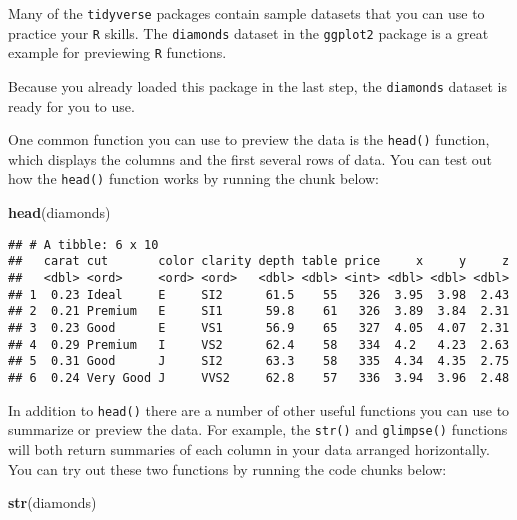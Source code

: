\documentclass[
]{article}
\newenvironment{Shaded}{\begin{snugshade}}{\end{snugshade}}
\newcommand{\FunctionTok}[1]{\textcolor[rgb]{0.13,0.29,0.53}{\textbf{#1}}}
\newcommand{\NormalTok}[1]{#1}
\begin{document}
Many of the \texttt{tidyverse} packages contain sample datasets that you
can use to practice your \texttt{R} skills. The \texttt{diamonds}
dataset in the \texttt{ggplot2} package is a great example for
previewing \texttt{R} functions.

Because you already loaded this package in the last step, the
\texttt{diamonds} dataset is ready for you to use.

One common function you can use to preview the data is the
\texttt{head()} function, which displays the columns and the first
several rows of data. You can test out how the \texttt{head()} function
works by running the chunk below:

\begin{Shaded}
\begin{Highlighting}[]
\FunctionTok{head}\NormalTok{(diamonds)}
\end{Highlighting}
\end{Shaded}

\begin{verbatim}
## # A tibble: 6 x 10
##   carat cut       color clarity depth table price     x     y     z
##   <dbl> <ord>     <ord> <ord>   <dbl> <dbl> <int> <dbl> <dbl> <dbl>
## 1  0.23 Ideal     E     SI2      61.5    55   326  3.95  3.98  2.43
## 2  0.21 Premium   E     SI1      59.8    61   326  3.89  3.84  2.31
## 3  0.23 Good      E     VS1      56.9    65   327  4.05  4.07  2.31
## 4  0.29 Premium   I     VS2      62.4    58   334  4.2   4.23  2.63
## 5  0.31 Good      J     SI2      63.3    58   335  4.34  4.35  2.75
## 6  0.24 Very Good J     VVS2     62.8    57   336  3.94  3.96  2.48
\end{verbatim}

In addition to \texttt{head()} there are a number of other useful
functions you can use to summarize or preview the data. For example, the
\texttt{str()} and \texttt{glimpse()} functions will both return
summaries of each column in your data arranged horizontally. You can try
out these two functions by running the code chunks below:

\begin{Shaded}
\begin{Highlighting}[]
\FunctionTok{str}\NormalTok{(diamonds)}
\end{Highlighting}
\end{Shaded}
\end{document}
